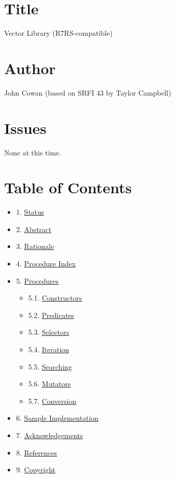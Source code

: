 \section{Title}\label{title}

Vector Library (R7RS-compatible)

\section{Author}\label{author}

John Cowan (based on SRFI 43 by Taylor Campbell)

\section{Issues}\label{issues}

None at this time.

\section{Table of Contents}\label{table-of-contents}

\begin{itemize}
\tightlist
\item
  1. \protect\hyperlink{Status}{Status}
\item
  2. \protect\hyperlink{Abstract}{Abstract}
\item
  3. \protect\hyperlink{Rationale}{Rationale}
\item
  4. \protect\hyperlink{ProcIndex}{Procedure Index}
\item
  5. \protect\hyperlink{Procs}{Procedures}

  \begin{itemize}
  \tightlist
  \item
    5.1. \protect\hyperlink{Constructors}{Constructors}
  \item
    5.2. \protect\hyperlink{Predicates}{Predicates}
  \item
    5.3. \protect\hyperlink{Selectors}{Selectors}
  \item
    5.4. \protect\hyperlink{Iteration}{Iteration}
  \item
    5.5. \protect\hyperlink{Searching}{Searching}
  \item
    5.6. \protect\hyperlink{Mutators}{Mutators}
  \item
    5.7. \protect\hyperlink{Conversion}{Conversion}
  \end{itemize}
\item
  6. \protect\hyperlink{SampImpl}{Sample Implementation}
\item
  7. \protect\hyperlink{Acknowledgements}{Acknowledgements}
\item
  8. \protect\hyperlink{References}{References}
\item
  9. \protect\hyperlink{Copyright}{Copyright}
\end{itemize}

